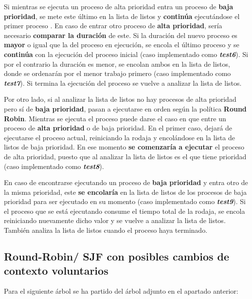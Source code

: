 \documentclass[10pt, spanish, pdftex]{template/UC3M_document}
\begin{document}
Si mientras se ejecuta un proceso de alta prioridad entra un proceso de \textbf{baja prioridad}, se mete este último en la lista de listos y \textbf{continúa} ejecutándose el primer proceso . En caso de entrar otro proceso de \textbf{alta prioridad}, sería necesario \textbf{comparar la duración} de este. Si la duración del nuevo proceso es \textbf{mayor} o igual que la del proceso en ejecución, se encola el último proceso y se \textbf{continúa} con la ejecución del proceso inicial (caso implementado como \textbf{\textit{test6}}). Si por el contrario la duración es menor, se encolan ambos en la lista de listos, donde se ordenarán por el menor trabajo primero (caso implementado como \textbf{\textit{test7}}). Si termina la ejecución del proceso se vuelve a analizar la lista de listos.

Por otro lado, si al analizar la lista de listos no hay procesos de alta prioridad pero sí de \textbf{baja prioridad}, pasan a ejecutarse en orden según la política \textbf{Round Robin}. Mientras se ejecuta el proceso puede darse el caso en que entre un proceso de \textbf{alta prioridad} o de baja prioridad. En el primer caso, dejará de ejecutarse el proceso actual, reiniciando la rodaja y encolándose en la lista de listos de baja prioridad. En ese momento \textbf{se comenzaría a ejecutar} el proceso de alta prioridad, puesto que al analizar la lista de listos es el que tiene prioridad (caso implementado como \textbf{\textit{test8}}).

En caso de encontrarse ejecutando un proceso de \textbf{baja prioridad} y entra otro de la misma prioridad, este \textbf{se encolaría} en la lista de listos de los procesos de baja prioridad para ser ejecutado en su momento (caso implementado como \textbf{\textit{test9}}). Si el proceso que se está ejecutando consume el tiempo total de la rodaja, se encola reiniciando nuevamente dicho valor y se vuelve a analizar la lista de listos. También analiza la lista de listos cuando el proceso haya terminado.


\subsection{Round-Robin/ SJF con posibles cambios de contexto voluntarios}
Para el siguiente árbol se ha partido del árbol adjunto en el apartado anterior:
\end{document}
